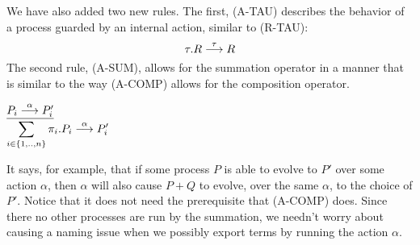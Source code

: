 We have also added two new rules.  
The first, (A-TAU) describes the behavior of a process guarded by an internal action, similar to (R-TAU):
\[
	\tau.R \overset{{\tau}}{\longrightarrow} R
\]  
The second rule, (A-SUM), allows for the summation operator in a manner that is similar to the way (A-COMP) allows for the composition operator.
\begin{center}
	$\underline{P_i \overset{{\alpha}}{\longrightarrow} P_i'}$\\
	$\displaystyle\sum_{i\in \{1,..,n\}}\pi_i.P_i \overset{{\alpha}}{\longrightarrow} P_i'$\\
\end{center}
It says, for example, that if some process $P$ is able to evolve to $P'$ over some action $\alpha$, then $\alpha$ will also cause $P+Q$ to evolve, over the same $\alpha$, to the choice of $P'$.
Notice that it does not need the prerequisite that (A-COMP) does. 
Since there no other processes are run by the summation, we needn't worry about causing a naming issue when we possibly export terms by running the action $\alpha$.

